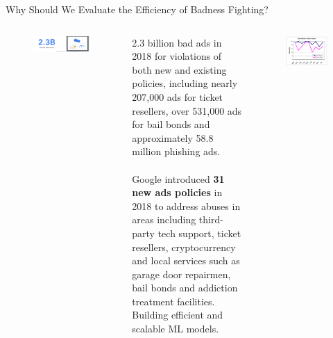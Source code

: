 \documentclass[nobackground,dvipsnames,table]{beamer}
\begin{document}
\begin{frame}{Why Should We Evaluate the Efficiency of Badness Fighting?}
    \begin{columns}[T]
            \begin{figure}
                \includegraphics[width=\textwidth]{bad-ads-taken-down}
            \end{figure}
            \tiny
            2.3 billion bad ads in 2018 for violations of both new and existing policies, including nearly 207,000 ads for ticket resellers, over 531,000 ads for bail bonds and approximately 58.8 million phishing ads. \\~\\

            Google  introduced \textbf{31 new ads policies} in 2018 to address abuses in areas including third-party tech support, ticket resellers, cryptocurrency and local services such as garage door repairmen, bail bonds and addiction treatment facilities.
            \centering
            Building efficient and scalable ML models.\\
            \begin{figure}
                \includegraphics[width=\textwidth]{case-based-vs-naive-bayes}
            \end{figure}
    \end{columns}
\end{frame}
\end{document}
